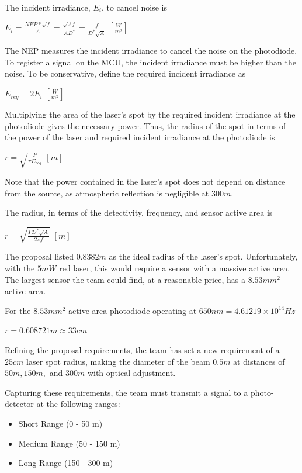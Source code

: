 \documentclass[letterpaper,10pt]{article}
\begin{document}
\begin{spacing}{1.15}
The incident irradiance, $E_i$, to cancel noise is
\begin{center}
	{\large $E_i = \frac{NEP * \sqrt{f}}{A} = \frac{\sqrt{Af}}{AD^*} = \frac{f}{D^*\sqrt{A}}$} $[\frac{W}{m^{2}}]$
\end{center}

The NEP measures the incident irradiance to cancel the noise on the photodiode. To register a signal on the MCU, the incident irradiance must be higher than the noise. To be conservative, define the required incident irradiance as 
\begin{center}
	{\large $E_{req} = 2E_i$} $[\frac{W}{m^{2}}]$
\end{center}

Multiplying the area of the laser's spot by the required incident irradiance at the photodiode gives the necessary power. Thus, the radius of the spot in terms of the power of the laser and required incident irradiance at the photodiode is 
\begin{center}
	{\large $r = \sqrt{\frac{P}{\pi E_{req}}}$} $[m]$
\end{center}

Note that the power contained in the laser's spot does not depend on distance from the source, as atmospheric reflection is negligible at $300 m$.

The radius, in terms of the detectivity, frequency, and sensor active area is
\begin{center}
	{\large $r = \sqrt{\frac{PD^*\sqrt{A}}{2 \pi f}}$} $[m]$
\end{center}

The proposal listed $0.8382 m$ as the ideal radius of the laser's spot. Unfortunately, with the $5mW$ red laser, this would require a sensor with a massive active area. The largest sensor the team could find, at a reasonable price, has a $8.53 mm^2$ active area. 

For the $8.53 mm^2$ active area photodiode operating at $650 nm = 4.61219 × 10^{14} Hz$ 
\begin{center}
	$r = 0.608721 m \approx 33 cm$
\end{center}

Refining the proposal requirements, the team has set a new requirement of a $25 cm$ laser spot radius, making the diameter of the beam $0.5m$ at distances of $50m, 150m,$ and $300m$ with optical adjustment. 

Capturing these requirements, the team must transmit a signal to a photo-detector at the following ranges:
\begin{itemize}
	\item Short Range (0 - 50 m)
	\item Medium Range (50 - 150 m)
	\item Long Range (150 - 300 m)
\end{itemize}


\end{spacing}
\end{document}
